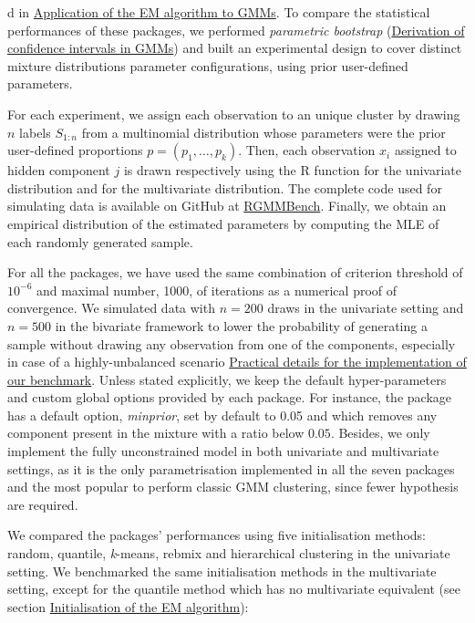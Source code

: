 d in \protect\hyperlink{application-of-the-em-algorithm-to-gmms}{Application of the EM algorithm to GMMs}. To compare the statistical performances of these packages, we performed \emph{parametric bootstrap} (\protect\hyperlink{derivation-of-confidence-intervals-in-gmms}{Derivation of confidence intervals in GMMs}) and built an experimental design to cover distinct mixture distributions parameter configurations, using prior user-defined parameters.

For each experiment, we assign each observation to an unique cluster by drawing \(n\) labels \(S_{1:n}\) from a multinomial distribution whose parameters were the prior user-defined proportions \(p=(p_1, \ldots, p_k)\). Then, each observation \(x_i\) assigned to hidden component \(j\) is drawn respectively using the R function  for the univariate distribution and  for the multivariate distribution. The complete code used for simulating data is
available on GitHub at \href{https://github.com/bastienchassagnol-servier/RGMMBench}{RGMMBench}. Finally, we obtain an empirical distribution of the estimated parameters by computing the MLE
of each randomly generated sample.

For all the packages, we have used the same combination of criterion threshold of
\(10^{-6}\) and maximal number, 1000, of iterations as a numerical proof of convergence. We simulated data with \(n = 200\) draws in the univariate setting and \(n=500\) in the bivariate framework to lower the probability of generating a sample without drawing any observation from one of the components, especially in case of a highly-unbalanced scenario \protect\hyperlink{practical-details-for-the-implementation-of-our-benchmark}{Practical details for the implementation of our benchmark}. Unless stated explicitly, we keep the default hyper-parameters and custom global options provided by each package. For instance, the  package has a default option, \emph{minprior}, set by default to 0.05 and which removes any component present in the mixture with a ratio below \(0.05\). Besides, we only implement the fully unconstrained model in both univariate and multivariate settings, as it is the only parametrisation implemented in all the seven packages and the most popular to perform classic GMM clustering, since fewer hypothesis are required.

We compared the packages' performances using five
initialisation methods: random, quantile, \emph{k}-means, rebmix and hierarchical clustering in the univariate setting. We benchmarked the same initialisation methods in the multivariate setting, except for the quantile method which has no multivariate equivalent (see section \protect\hyperlink{initialisation-of-the-em-algorithm}{Initialisation of the EM algorithm}):

